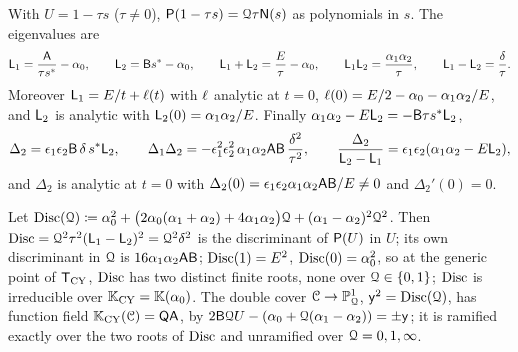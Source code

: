 \begin{lem}
\label{lem:set-eig}
With $U=1-\tau s$ ($\tau\neq0$), $\mathsf{P}(1-\tau s)=\mathcal{Q}\tau\mathsf{N}(s)$ as polynomials in $s$. The eigenvalues are
\[
\mathsf{L}_1=\frac{\mathsf{A}}{\tau s^{\ast}}-\alpha_0,\qquad \mathsf{L}_2=\mathsf{B}s^{\ast}-\alpha_0,\qquad
\mathsf{L}_1+\mathsf{L}_2=\frac E\tau-\alpha_0,\qquad \mathsf{L}_1\mathsf{L}_2=\frac{\alpha_1\alpha_2}{\tau},\qquad \mathsf{L}_1-\mathsf{L}_2=\frac\delta\tau .
\]
Moreover $\mathsf{L}_1=E/t+\ell(t)$ with $\ell$ analytic at $t=0$, $\ell(0)=E/2-\alpha_0-\alpha_1\alpha_2/E$, and $\mathsf{L}_2$ is analytic with $\mathsf{L}_2(0)=\alpha_1\alpha_2/E$. Finally $\alpha_1\alpha_2-E\mathsf{L}_2=-\mathsf{B}\tau s^{\ast}\mathsf{L}_2$,
\[
\Delta_2=\epsilon_1\epsilon_2\mathsf{B}\,\delta\,s^{\ast}\mathsf{L}_2,\qquad
\Delta_1\Delta_2=-\epsilon_1^2\epsilon_2^2\,\alpha_1\alpha_2\mathsf{A}\mathsf{B}\,\frac{\delta^2}{\tau^2},\qquad
\frac{\Delta_2}{\mathsf{L}_2-\mathsf{L}_1}=\epsilon_1\epsilon_2(\alpha_1\alpha_2-E\mathsf{L}_2),
\]
and $\Delta_2$ is analytic at $t=0$ with $\Delta_2(0)=\epsilon_1\epsilon_2\alpha_1\alpha_2\mathsf{A}\mathsf{B}/E\neq0$ and $\Delta_2'(0)=0$.
\end{lem}

\begin{lem}
\label{lem:set-disc}
Let $\operatorname{Disc}(\mathcal{Q})\coloneqq\alpha_0^2+\big(2\alpha_0(\alpha_1+\alpha_2)+4\alpha_1\alpha_2\big)\mathcal{Q}+(\alpha_1-\alpha_2)^2\mathcal{Q}^2$. Then $\operatorname{Disc}=\mathcal{Q}^2\tau^2(\mathsf{L}_1-\mathsf{L}_2)^2=\mathcal{Q}^2\delta^2$ is the discriminant of $\mathsf{P}(U)$ in $U$; its own discriminant in $\mathcal{Q}$ is $16\alpha_1\alpha_2\mathsf{A}\mathsf{B}$; $\operatorname{Disc}(1)=E^2$, $\operatorname{Disc}(0)=\alpha_0^2$, so at the generic point of $\mathsf{T}_{\mathrm{CY}}$, $\operatorname{Disc}$ has two distinct finite roots, none over $\mathcal{Q}\in\{0,1\}$; $\operatorname{Disc}$ is irreducible over $\mathbb{K}_{\mathrm{CY}}=\mathbb{K}(\alpha_0)$. The double cover $\mathcal{C}\to\mathbb{P}^1_{\mathcal{Q}}$, $\mathsf{y}^2=\operatorname{Disc}(\mathcal{Q})$, has function field $\mathbb{K}_{\mathrm{CY}}(\mathcal{C})=\mathsf{QA}$, by $2\mathsf{B}\mathcal{Q} U-(\alpha_0+\mathcal{Q}(\alpha_1-\alpha_2))=\pm\mathsf{y}$; it is ramified exactly over the two roots of $\operatorname{Disc}$ and unramified over $\mathcal{Q}=0,1,\infty$.
\end{lem}

